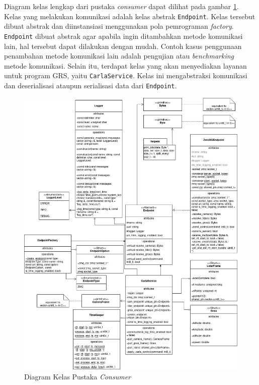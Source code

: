Diagram kelas lengkap dari pustaka \textit{consumer} dapat dilihat pada gambar
\ref{chapter-4-consumer-class-diagram}. Kelas yang melakukan komunikasi adalah
kelas abstrak \texttt{Endpoint}. Kelas tersebut dibuat abstrak dan diinstansiasi
menggunakan pola pemrograman \textit{factory}. \texttt{Endpoint} dibuat abstrak
agar apabila ingin ditambahkan metode komunikasi lain, hal tersebut dapat
dilakukan dengan mudah. Contoh kasus penggunaan penambahan metode komunikasi
lain adalah pengujian atau \textit{benchmarking} metode komunikasi. Selain itu,
terdapat kelas yang akan menyediakan layanan untuk program GRS, yaitu
\texttt{CarlaService}. Kelas ini mengabstraksi komunikasi dan deserialisasi
ataupun serialisasi data dari \texttt{Endpoint}.
\begin{figure}[!htbp]
	\centering
	\includegraphics[width=1.0\textwidth]{resources/chapter-4/consumer-class_diagram.png}
	\caption{Diagram Kelas Pustaka \textit{Consumer}}
	\label{chapter-4-consumer-class-diagram}
\end{figure}

